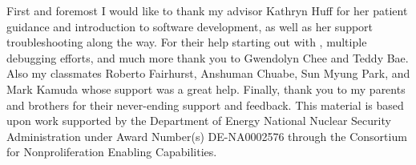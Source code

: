 First and foremost I would like to thank my advisor Kathryn Huff for her patient guidance
and introduction to software development, as well as her support troubleshooting along the
way. For their help starting out with \Cyclus, multiple debugging efforts, and much more thank you
to Gwendolyn Chee and Teddy Bae. Also my classmates Roberto Fairhurst, Anshuman Chuabe, Sun Myung Park, and Mark Kamuda whose support was a great help. Finally, thank you to my parents and brothers
for their never-ending support and feedback. This material is based upon work supported by the Department of Energy National
Nuclear Security Administration under Award Number(s) DE-NA0002576 through
the Consortium for Nonproliferation Enabling Capabilities.